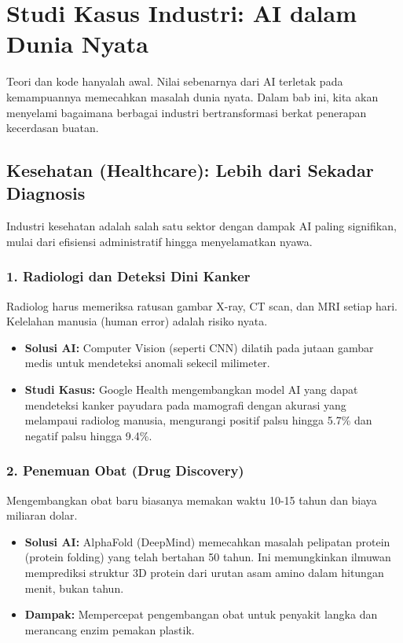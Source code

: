 \chapter{Studi Kasus Industri: AI dalam Dunia Nyata}
\label{chap:case_studies}

Teori dan kode hanyalah awal. Nilai sebenarnya dari AI terletak pada kemampuannya memecahkan masalah dunia nyata. Dalam bab ini, kita akan menyelami bagaimana berbagai industri bertransformasi berkat penerapan kecerdasan buatan.

\section{Kesehatan (Healthcare): Lebih dari Sekadar Diagnosis}

Industri kesehatan adalah salah satu sektor dengan dampak AI paling signifikan, mulai dari efisiensi administratif hingga menyelamatkan nyawa.

\subsection{1. Radiologi dan Deteksi Dini Kanker}
Radiolog harus memeriksa ratusan gambar X-ray, CT scan, dan MRI setiap hari. Kelelahan manusia (human error) adalah risiko nyata.
\begin{itemize}
    \item \textbf{Solusi AI:} Computer Vision (seperti CNN) dilatih pada jutaan gambar medis untuk mendeteksi anomali sekecil milimeter.
    \item \textbf{Studi Kasus:} Google Health mengembangkan model AI yang dapat mendeteksi kanker payudara pada mamografi dengan akurasi yang melampaui radiolog manusia, mengurangi positif palsu hingga 5.7\% dan negatif palsu hingga 9.4\%.
\end{itemize}

\subsection{2. Penemuan Obat (Drug Discovery)}
Mengembangkan obat baru biasanya memakan waktu 10-15 tahun dan biaya miliaran dolar.
\begin{itemize}
    \item \textbf{Solusi AI:} AlphaFold (DeepMind) memecahkan masalah pelipatan protein (protein folding) yang telah bertahan 50 tahun. Ini memungkinkan ilmuwan memprediksi struktur 3D protein dari urutan asam amino dalam hitungan menit, bukan tahun.
    \item \textbf{Dampak:} Mempercepat pengembangan obat untuk penyakit langka dan merancang enzim pemakan plastik.
\end{itemize}

